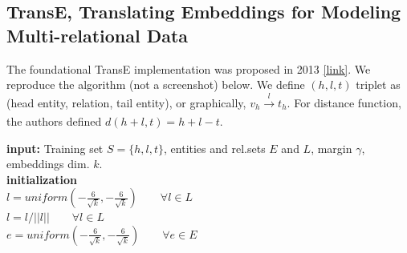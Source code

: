 \subsection{TransE, Translating Embeddings for Modeling Multi-relational Data} \label{ss_52_transe}

The foundational TransE implementation was proposed in 2013 \href{https://everest.hds.utc.fr/lib/exe/fetch.php?media=en:cr_paper_nips13.pdf}{[link]}. We reproduce the algorithm (not a screenshot) below. We define $(h, l ,t)$ triplet as (head entity, relation, tail entity), or graphically, $v_h \xrightarrow[]{l} t_h$. For distance function, the authors defined $d(h+l, t)= h + l -t$. 

\begin{algorithm}[H]
\SetAlgoLined
\textbf{input:} Training set $S=\{h, l, t\}$, entities and rel.sets $E$ and $L$, margin $\gamma$, embeddings dim. $k$. \\
\textbf{initialization} \\
\hspace*{\algorithmicindent} $l = uniform(-\frac{6}{\sqrt{k}}, -\frac{6}{\sqrt{k}}) \qquad  \forall l \in L$  \\
\hspace*{\algorithmicindent} $l = l / ||l|| \qquad \forall l \in L$ \\
\hspace*{\algorithmicindent} $e = uniform(-\frac{6}{\sqrt{k}}, -\frac{6}{\sqrt{k}}) \qquad \forall e \in E$ \\
\end{algorithm}

